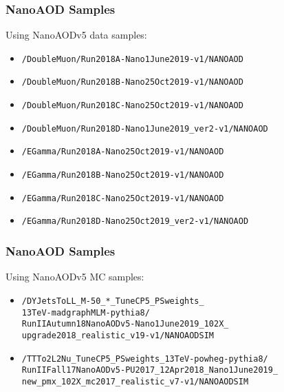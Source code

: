 \documentclass{beamer}
\begin{document}
\begin{frame}
  \frametitle{NanoAOD Samples}

  Using NanoAODv5 data samples:

  \begin{itemize}
  \item \texttt{\small /DoubleMuon/Run2018A-Nano1June2019-v1/NANOAOD}
  \item \texttt{\small /DoubleMuon/Run2018B-Nano25Oct2019-v1/NANOAOD}
  \item \texttt{\small /DoubleMuon/Run2018C-Nano25Oct2019-v1/NANOAOD}
  \item \texttt{\small /DoubleMuon/Run2018D-Nano1June2019\_ver2-v1/NANOAOD}
  \item \texttt{\small /EGamma/Run2018A-Nano25Oct2019-v1/NANOAOD}
  \item \texttt{\small /EGamma/Run2018B-Nano25Oct2019-v1/NANOAOD}
  \item \texttt{\small /EGamma/Run2018C-Nano25Oct2019-v1/NANOAOD}
  \item \texttt{\small /EGamma/Run2018D-Nano25Oct2019\_ver2-v1/NANOAOD}
  \end{itemize}

\end{frame}


\begin{frame}
  \frametitle{NanoAOD Samples}

  Using NanoAODv5 MC samples:

  \begin{itemize}
  \item \texttt{\small /DYJetsToLL\_M-50\_*\_TuneCP5\_PSweights\_\\13TeV-madgraphMLM-pythia8/\\RunIIAutumn18NanoAODv5-Nano1June2019\_102X\_\\upgrade2018\_realistic\_v19-v1/NANOAODSIM}
  \item \texttt{\small /TTTo2L2Nu\_TuneCP5\_PSweights\_13TeV-powheg-pythia8/\\RunIIFall17NanoAODv5-PU2017\_12Apr2018\_Nano1June2019\_\\new\_pmx\_102X\_mc2017\_realistic\_v7-v1/NANOAODSIM}
  \end{itemize}

\end{frame}
\end{document}
